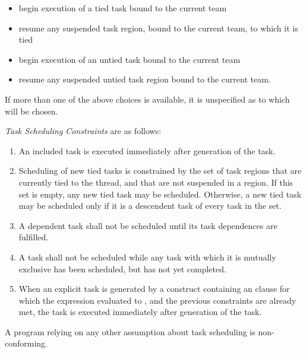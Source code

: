 \begin{itemize}
\item begin execution of a tied task bound to the current team

\item resume any suspended task region, bound to the current team, to which it is tied

\item begin execution of an untied task bound to the current team

\item resume any suspended untied task region bound to the current team.
\end{itemize}

If more than one of the above choices is available, it is unspecified as to which will be
chosen.

\emph{Task Scheduling Constraints} are as follows:

\begin{enumerate}
\item An included task is executed immediately after generation of the task.

\item Scheduling of new tied tasks is constrained by the set of task regions that are currently
tied to the thread, and that are not suspended in a  region. If this set is empty,
any new tied task may be scheduled. Otherwise, a new tied task may be scheduled only
if it is a descendent task of every task in the set.

\item A dependent task shall not be scheduled until its task dependences are fulfilled.

\item A task shall not be scheduled while any task with which it is
mutually exclusive has been scheduled, but has not yet completed.

\item When an explicit task is generated by a construct containing an  clause for which the
expression evaluated to , and the previous constraints are already met, the task is
executed immediately after generation of the task.
\end{enumerate}

A program relying on any other assumption about task scheduling is non-conforming.

